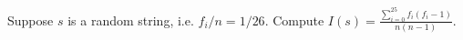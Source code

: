 Suppose $s$ is a random string, i.e. $f_i/n = 1/26$. Compute $I(s)
= \frac{\sum_{i=0}^{25}f_i(f_i-1)}{n(n-1)}$.

